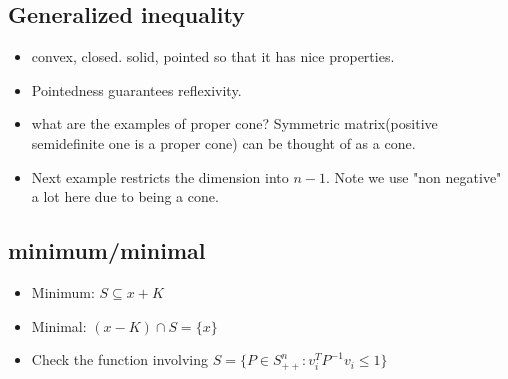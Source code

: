\documentclass{article}
\theoremstyle{remark}
\begin{document}
\subsection*{Generalized inequality}
\begin{itemize}
\item convex, closed. solid, pointed so that it has nice properties.
    \item Pointedness guarantees reflexivity.
    \item what are the examples of proper cone?
    Symmetric matrix(positive semidefinite one is a proper cone) can be thought of as a cone.
    \item Next example restricts the dimension into $n-1$. Note we use "non negative" a lot here due to being a cone.
\end{itemize}
\subsection*{minimum/minimal}
\begin{itemize}
    \item Minimum: $S\subseteq x+K$
    \item Minimal: $(x-K)\cap S=\{x\}$
    \item Check the function involving $S=\{ P\in S^n_{++}:v_i^TP^{-1}v_i\leq 1\}$
\end{itemize}
\end{document}
